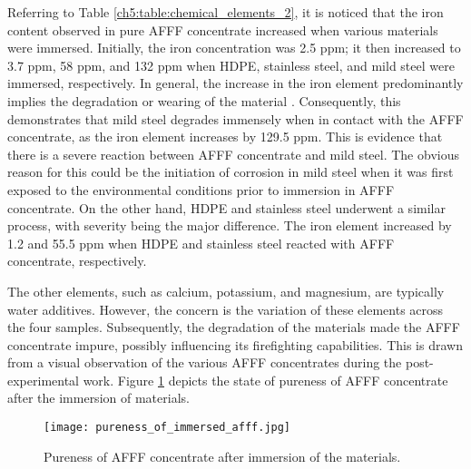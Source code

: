 Referring to Table \ref{ch5:table:chemical_elements_2}, it is noticed that the iron content observed in pure AFFF concentrate increased when various materials were immersed. Initially, the iron concentration was 2.5 ppm; it then increased to 3.7 ppm, 58 ppm, and 132 ppm when HDPE, stainless steel, and mild steel were immersed, respectively. In general, the increase in the iron element predominantly implies the degradation or wearing of the material \cite{mcarthur2004engineering}. Consequently, this demonstrates that mild steel degrades immensely when in contact with the AFFF concentrate, as the iron element increases by 129.5 ppm. This is evidence that there is a severe reaction between AFFF concentrate and mild steel. The obvious reason for this could be the initiation of corrosion in mild steel when it was first exposed to the environmental conditions prior to immersion in AFFF concentrate. On the other hand, HDPE and stainless steel underwent a similar process, with severity being the major difference. The iron element increased by 1.2 and 55.5 ppm when HDPE and stainless steel reacted with AFFF concentrate, respectively.

The other elements, such as calcium, potassium, and magnesium, are typically water additives. However, the concern is the variation of these elements across the four samples. Subsequently, the degradation of the materials made the AFFF concentrate impure, possibly influencing its firefighting capabilities. This is drawn from a visual observation of the various AFFF concentrates during the post-experimental work. Figure \ref{ch5:figure:pureness} depicts the state of pureness of AFFF concentrate after the immersion of materials.
 
\begin{figure}[H]
    \centering
    \texttt{[image: pureness\_of\_immersed\_afff.jpg]}
    \caption{Pureness of AFFF concentrate after immersion of the materials.}
    \label{ch5:figure:pureness}
\end{figure}

